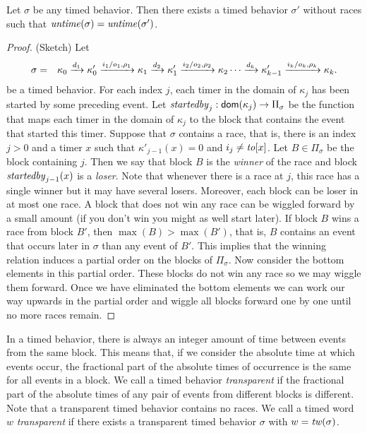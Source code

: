 \begin{lemma}
\label{race elimination}
Let $\sigma$ be any timed behavior.
Then there exists a timed behavior $\sigma'$ without races such that $\mathit{untime}(\sigma)=\mathit{untime}(\sigma')$.
\end{lemma}
\iflong
\begin{proof}
(Sketch) Let
\begin{eqnarray*}
\sigma & = & \kappa_0 \xrightarrow{d_1} \kappa'_0 \xrightarrow{i_1/o_1, \rho_1} \kappa_1 \xrightarrow{d_2} \kappa'_1 \xrightarrow{i_2/o_2, \rho_2} \kappa_2 \cdots
\xrightarrow{d_k} \kappa'_{k-1} \xrightarrow{i_k/o_k, \rho_k} \kappa_{k}.
\end{eqnarray*}
be a timed behavior.
%
For each index $j$, each timer in the domain of $\kappa_j$ has been started by some preceding event.
Let $\mathit{startedby}_j : {\textsf{dom}}(\kappa_j) \rightarrow \Pi_\sigma$ be the function that maps each timer in
the domain of $\kappa_j$ to the block that contains the event that started this timer.
Suppose that $\sigma$ contains a race, that is, there is an index $j>0$ and a timer $x$  
such that $\kappa'_{j-1}(x) = 0$ and $i_j \neq \mathit{to}[x]$.
Let $B \in \Pi_\sigma$ be the block containing $j$. Then we say that block $B$ is the \emph{winner} of the race and block
$\mathit{startedby}_{j-1}(x)$ is a \emph{loser}.
Note that whenever there is a race at $j$, this race has a single winner but it may have several losers.
Moreover, each block can be loser in at most one race.
A block that does not win any race can be wiggled forward by a small amount (if you don't win you might as well start later).
If block $B$ wins a race from block $B'$, then $\max(B)>\max(B')$, that is, $B$ contains an event that occurs later
in $\sigma$ than any event of $B'$.
This implies that the winning relation induces a partial order on the blocks of $\Pi_\sigma$.
Now consider the bottom elements in this partial order. These blocks do not win any race so we may wiggle them forward.
Once we have eliminated the bottom elements we can work our way upwards in the partial order and wiggle all blocks
forward one by one until no more races remain.
\end{proof}
\fi


In a timed behavior, there is always an integer amount of time between events from the same block.
This means that, if we consider the absolute time at which events occur, the fractional part of the absolute times
of occurrence is the same for all events in a block.
We call a timed behavior \emph{transparent} if the fractional part of the absolute times of any pair of events from different blocks is different. Note that a transparent timed behavior contains no races.
We call a timed word $w$ \emph{transparent} if there exists a transparent timed behavior $\sigma$ with 
$w = \mathit{tw}(\sigma)$.

